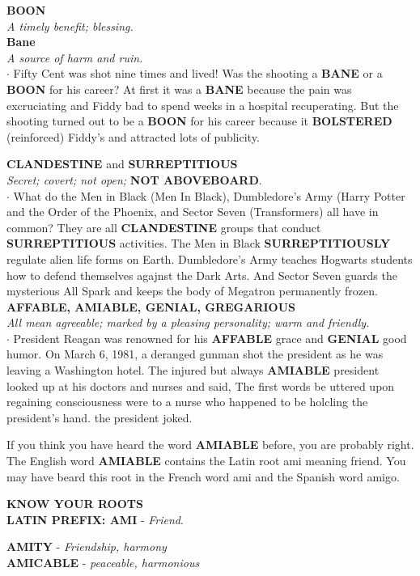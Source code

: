\documentclass{exam}
\begin{document}
\begin{questions}
\question \textbf{BOON}\\ \textit{A timely benefit; blessing.}\\ \textbf{Bane}\\
\textit{A source of harm and ruin.} \\

$ \cdot $ Fifty Cent was shot nine times and lived! Was the
shooting a \textbf{BANE} or a \textbf{BOON} for his career? At first it
was a \textbf{BANE} because the pain was excruciating and
Fiddy bad to spend weeks in a hospital recuperating.
But the shooting turned out to be a \textbf{BOON} for his
career because it \textbf{BOLSTERED} (reinforced) Fiddy's
 and attracted lots of publicity.

\question \textbf{CLANDESTINE} and \textbf{SURREPTITIOUS }\\
\textit{Secret; covert; not open;} \textbf{NOT ABOVEBOARD}.\\

$ \cdot $ What do the Men in Black (Men In Black),
Dumbledore's Army (Harry Potter and the Order of the Phoenix, and Sector Seven (Transformers) all
have in common? They are all \textbf{CLANDESTINE} groups
that conduct \textbf{SURREPTITIOUS} activities. The Men in Black \textbf{SURREPTITIOUSLY} regulate alien life forms on Earth. Dumbledore's Army teaches Hogwarts students how to defend themselves agajnst the Dark Arts.
And Sector Seven guards the mysterious All Spark and
keeps the body of Megatron permanently frozen.
\question \textbf{AFFABLE, AMIABLE, GENIAL,
GREGARIOUS}\\ \textit{All mean agreeable; marked by a pleasing
personality; warm and friendly.}\\

$ \cdot $ President Reagan was renowned for his \textbf{AFFABLE}
grace and \textbf{GENIAL} good humor. On March 6, 1981, a
deranged gunman shot the president as he was
leaving a Washington hotel. The injured but always
\textbf{AMIABLE} president looked up at his doctors and
nurses and said,  The
first words be uttered upon regaining consciousness
were to a nurse who happened to be holcling the
president's hand.  the
president joked.

\begin{tcolorbox}

If you think you have heard the word \textbf{AMIABLE} before, you are probably right. The English word
\textbf{AMIABLE} contains the Latin root ami meaning
friend. You may have beard this root in the
French word ami and the Spanish word amigo.
\begin{center}
\textbf{ KNOW YOUR ROOTS}\\
\textbf{LATIN PREFIX: AMI} - \textit{Friend}.\\  
\end{center}  
\textbf{AMITY} - \textit{Friendship, harmony}\\
\textbf{AMICABLE} - \textit{peaceable, harmonious}
\end{tcolorbox}


\end{questions}
\end{document}
